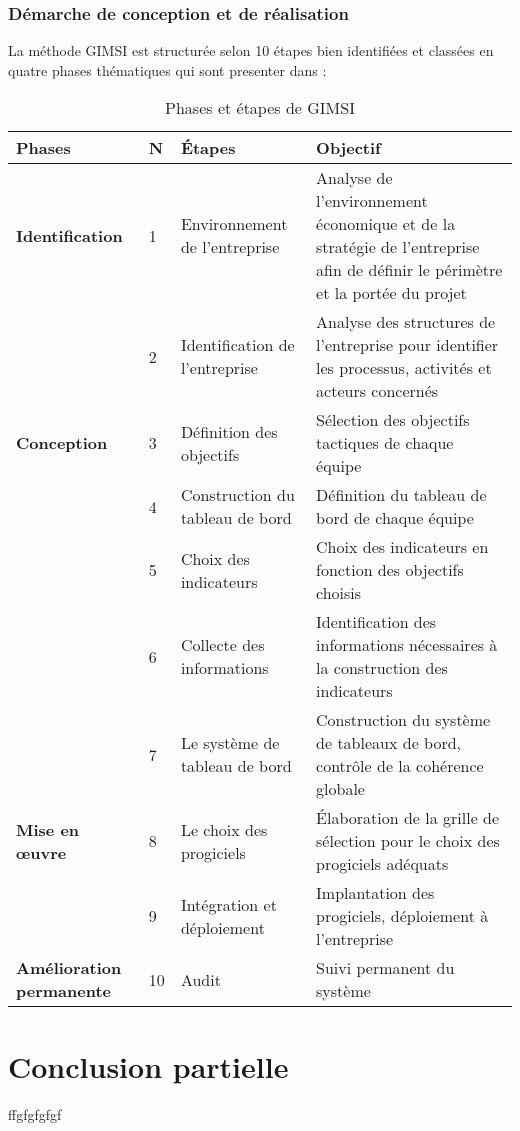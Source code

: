             \subsubsection[Démarche de conception et de réalisation]{Démarche de conception et de réalisation}
            La méthode GIMSI est structurée selon 10 étapes
            bien identifiées et classées en quatre phases thématiques qui sont presenter
            dans \cite*[Tab. \ref{table:phaseEtapeGimsi}]{fernandez2011nouveaux} :
            \begin{longtable}{p{3cm} p{0cm} p{4cm} p{5cm}}
                \caption{Phases et étapes de GIMSI}
                \label{table:phaseEtapeGimsi}
                \\\hline\hline
                    \textbf{Phases} & \textbf{N} & \textbf{Étapes} & \textbf{Objectif}
                \\\hline\hline
                    \textbf{Identification} & 1 & Environnement
                    de l’entreprise & Analyse de l’environnement économique
                    et de la stratégie de l’entreprise afin de
                    définir le périmètre et la portée du projet
                    \\
                        & 2 & Identification de l’entreprise & Analyse des structures
                    de l’entreprise pour identifier les processus, activités et acteurs concernés
                    \\
                    \textbf{Conception} & 3 & Définition des objectifs & 
                    Sélection des objectifs tactiques de chaque équipe
                    \\
                        & 4 & Construction du tableau de bord & Définition du tableau
                    de bord de chaque équipe
                    \\
                        & 5 & Choix des indicateurs & Choix des indicateurs en fonction
                    des objectifs choisis
                    \\
                        & 6 & Collecte des informations & Identification des informations nécessaires
                    à la construction des indicateurs
                    \\
                        & 7 & Le système de tableau de bord & Construction du
                    système de tableaux de bord, contrôle de la cohérence globale
                    \\
                    \textbf{Mise en œuvre} & 8 & Le choix des progiciels &
                    Élaboration de la grille de sélection pour le choix des progiciels adéquats
                    \\
                    & 9 & Intégration et déploiement & Implantation des progiciels,
                    déploiement à l’entreprise
                    \\
                    \textbf{Amélioration permanente} & 10 & Audit & Suivi
                    permanent du système
                \\\bottomrule
            \end{longtable}
    \section[Conclusion partielle]{Conclusion partielle}
    ffgfgfgfgf